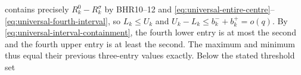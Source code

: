contains precisely $R_k^0-R_k^\sigma$ by BHR10--12 and
\eqref{eq:universal-entire-centre}--\eqref{eq:universal-fourth-interval},
so $L_k\leq U_k$ and $U_k-L_k\leq b_k^-+b_k^+=o(q)$.
By \eqref{eq:universal-interval-containment}, the fourth lower
entry is at most the second and the fourth upper entry is
at least the second. The maximum and minimum thus equal
their previous three-entry values exactly.
Below the stated threshold set